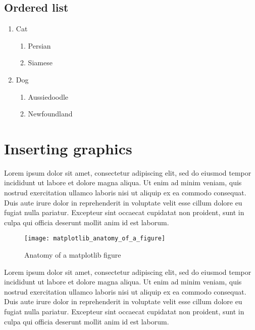 \documentclass[10pt, letterpaper, twoside]{article}
\begin{document}
\subsection{Ordered list}\label{sec:ordered_list}
\begin{enumerate}
    \item Cat
        \begin{enumerate}
            \item Persian
            \item Siamese
        \end{enumerate}
    \item Dog
        \begin{enumerate}
            \item Aussiedoodle
            \item Newfoundland
        \end{enumerate}
\end{enumerate}

\newpage
\section{Inserting graphics}\label{sec:graphics}
Lorem ipsum dolor sit amet, consectetur adipiscing elit, sed do eiusmod tempor incididunt ut labore et dolore magna aliqua. Ut enim ad minim veniam, quis nostrud exercitation ullamco laboris nisi ut aliquip ex ea commodo consequat. Duis aute irure dolor in reprehenderit in voluptate velit esse cillum dolore eu fugiat nulla pariatur. Excepteur sint occaecat cupidatat non proident, sunt in culpa qui officia deserunt mollit anim id est laborum.

\begin{figure}[H]
\texttt{[image: matplotlib\_anatomy\_of\_a\_figure]}
\caption{Anatomy of a matplotlib figure}
\end{figure}
\label{fig:anatomy_of_a_matplotlib_figure}

Lorem ipsum dolor sit amet, consectetur adipiscing elit, sed do eiusmod tempor incididunt ut labore et dolore magna aliqua. Ut enim ad minim veniam, quis nostrud exercitation ullamco laboris nisi ut aliquip ex ea commodo consequat. Duis aute irure dolor in reprehenderit in voluptate velit esse cillum dolore eu fugiat nulla pariatur. Excepteur sint occaecat cupidatat non proident, sunt in culpa qui officia deserunt mollit anim id est laborum.
\end{document}
